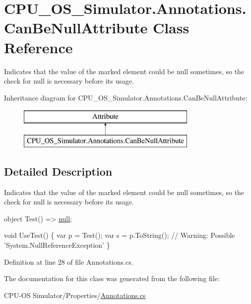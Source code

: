 \hypertarget{class_c_p_u___o_s___simulator_1_1_annotations_1_1_can_be_null_attribute}{}\section{C\+P\+U\+\_\+\+O\+S\+\_\+\+Simulator.\+Annotations.\+Can\+Be\+Null\+Attribute Class Reference}
\label{class_c_p_u___o_s___simulator_1_1_annotations_1_1_can_be_null_attribute}


Indicates that the value of the marked element could be {\ttfamily null} sometimes, so the check for {\ttfamily null} is necessary before its usage.  


Inheritance diagram for C\+P\+U\+\_\+\+O\+S\+\_\+\+Simulator.\+Annotations.\+Can\+Be\+Null\+Attribute\+:\begin{figure}[H]
\begin{center}
\leavevmode
\includegraphics[height=2.000000cm]{class_c_p_u___o_s___simulator_1_1_annotations_1_1_can_be_null_attribute}
\end{center}
\end{figure}


\subsection{Detailed Description}
Indicates that the value of the marked element could be {\ttfamily null} sometimes, so the check for {\ttfamily null} is necessary before its usage. 


\begin{DoxyCode}
[CanBeNull] \textcolor{keywordtype}{object} Test() => \hyperlink{_old_01_process_01_flags_8cs_afb8e110345c45e74478894341ab6b28e}{null};

\textcolor{keywordtype}{void} UseTest() \{
  var p = Test();
  var s = p.ToString(); \textcolor{comment}{// Warning: Possible 'System.NullReferenceException'}
\}
\end{DoxyCode}


Definition at line 28 of file Annotations.\+cs.



The documentation for this class was generated from the following file\+:\begin{DoxyCompactItemize}
\item 
C\+P\+U-\/\+O\+S Simulator/\+Properties/\hyperlink{_annotations_8cs}{Annotations.\+cs}\end{DoxyCompactItemize}
